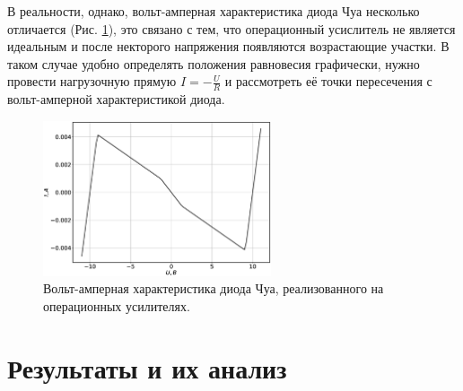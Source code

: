 \documentclass[12pt]{article}
\begin{document}
В реальности, однако, вольт-амперная характеристика диода Чуа несколько отличается (Рис. \ref{fig:VAC}), это 
связано с тем, что операционный усислитель не является идеальным и после некторого напряжения появляются возрастающие участки. 
В таком случае удобно определять положения равновесия графически, нужно провести нагрузочную прямую $I = -\frac{U}{R}$ и рассмотреть 
её точки пересечения с вольт-амперной характеристикой диода.
\begin{figure}[H]
	\centering
	\includegraphics[width=0.6\textwidth]{VAC.eps}
	\caption{Вольт-амперная характеристика диода Чуа, реализованного на операционных усилителях.}
	\label{fig:VAC}
\end{figure}

\section*{Результаты и их анализ}
\end{document}
